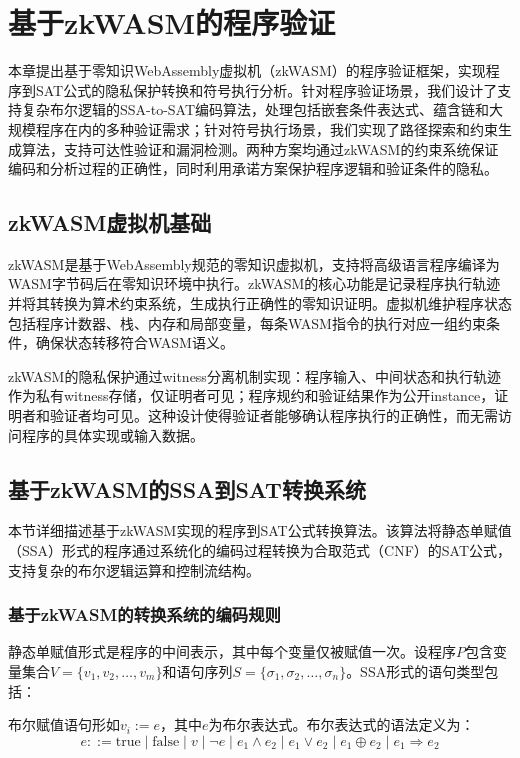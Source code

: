\chapter{基于zkWASM的程序验证}

本章提出基于零知识WebAssembly虚拟机（zkWASM）的程序验证框架，实现程序到SAT公式的隐私保护转换和符号执行分析。针对程序验证场景，我们设计了支持复杂布尔逻辑的SSA-to-SAT编码算法，处理包括嵌套条件表达式、蕴含链和大规模程序在内的多种验证需求；针对符号执行场景，我们实现了路径探索和约束生成算法，支持可达性验证和漏洞检测。两种方案均通过zkWASM的约束系统保证编码和分析过程的正确性，同时利用承诺方案保护程序逻辑和验证条件的隐私。

\section{zkWASM虚拟机基础}

zkWASM是基于WebAssembly规范的零知识虚拟机，支持将高级语言程序编译为WASM字节码后在零知识环境中执行\cite{zkwasm}。zkWASM的核心功能是记录程序执行轨迹并将其转换为算术约束系统，生成执行正确性的零知识证明。虚拟机维护程序状态包括程序计数器、栈、内存和局部变量，每条WASM指令的执行对应一组约束条件，确保状态转移符合WASM语义。

zkWASM的隐私保护通过witness分离机制实现：程序输入、中间状态和执行轨迹作为私有witness存储，仅证明者可见；程序规约和验证结果作为公开instance，证明者和验证者均可见。这种设计使得验证者能够确认程序执行的正确性，而无需访问程序的具体实现或输入数据。

\section{基于zkWASM的SSA到SAT转换系统}

本节详细描述基于zkWASM实现的程序到SAT公式转换算法。该算法将静态单赋值（SSA）形式的程序通过系统化的编码过程转换为合取范式（CNF）的SAT公式，支持复杂的布尔逻辑运算和控制流结构。

\subsection{基于zkWASM的转换系统的编码规则}

静态单赋值形式是程序的中间表示，其中每个变量仅被赋值一次。设程序$P$包含变量集合$V = \{v_1, v_2, \ldots, v_m\}$和语句序列$S = \{\sigma_1, \sigma_2, \ldots, \sigma_n\}$。SSA形式的语句类型包括：

布尔赋值语句形如$v_i := e$，其中$e$为布尔表达式。布尔表达式的语法定义为：
$$e ::= \text{true} \mid \text{false} \mid v \mid \neg e \mid e_1 \wedge e_2 \mid e_1 \vee e_2 \mid e_1 \oplus e_2 \mid e_1 \Rightarrow e_2$$

